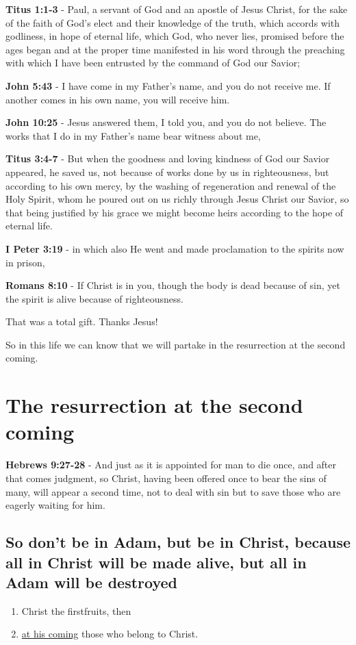 \documentclass[11pt]{article}
\begin{document}
\textbf{Titus 1:1-3} - Paul, a servant of God and an apostle of Jesus Christ, for the sake of the faith of God's elect and their knowledge of the truth, which accords with godliness, in hope of eternal life, which God, who never lies, promised before the ages began and at the proper time manifested in his word through the preaching with which I have been entrusted by the command of God our Savior;

\textbf{John 5:43} - I have come in my Father's name, and you do not receive me. If another comes in his own name, you will receive him.

\textbf{John 10:25} - Jesus answered them, I told you, and you do not believe. The works that I do in my Father's name bear witness about me,

\textbf{Titus 3:4-7} - But when the goodness and loving kindness of God our Savior appeared, he saved us, not because of works done by us in righteousness, but according to his own mercy, by the washing of regeneration and renewal of the Holy Spirit, whom he poured out on us richly through Jesus Christ our Savior, so that being justified by his grace we might become heirs according to the hope of eternal life.

\textbf{I Peter 3:19} - in which also He went and made proclamation to the spirits now in prison,

\textbf{Romans 8:10} - If Christ is in you, though the body is dead because of sin, yet the spirit is alive because of righteousness.

That was a total gift. Thanks Jesus!

So in this life we can know that we will partake in the resurrection at the second coming.

\section{The resurrection at the second coming}
\label{sec:orga97799c}
\textbf{Hebrews 9:27-28} - And just as it is appointed for man to die once, and after that comes judgment, so Christ, having been offered once to bear the sins of many, will appear a second time, not to deal with sin but to save those who are eagerly waiting for him.

\subsection{So don't be in Adam, but be in Christ, because all in Christ will be made alive, but all in Adam will be destroyed}
\label{sec:org6f9484b}
\begin{enumerate}
\item Christ the firstfruits, then
\item \uline{at his coming} those who belong to Christ.
\end{enumerate}
\end{document}
